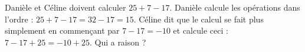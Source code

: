 
\begin{exercice}\label{exo2smath-0041}

    Danièle et Céline doivent calculer $25+7-17$. Danièle calcule les opérations dans l'ordre : $25+7-17=32-17=15$. Céline dit que le calcul se fait plus simplement en commençant par \( 7-17=-10\) et calcule ceci : \( 7-17+25=-10+25\). Qui a raison ?

\end{exercice}
